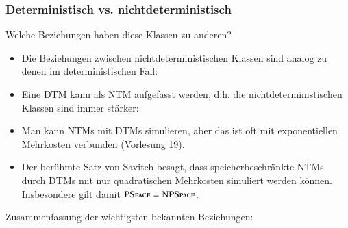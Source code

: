 \documentclass[aspectratio=1610,onlymath]{beamer}
\begin{document}
\begin{frame}\frametitle{Deterministisch vs. nichtdeterministisch}

%
Welche Beziehungen haben diese Klassen zu anderen?\pause
{\footnotesize
\begin{itemize}
\item Die Beziehungen zwischen nichtdeterministischen Klassen sind analog zu denen im deterministischen Fall:\\[1ex]
\pause
\item Eine DTM kann als NTM aufgefasst werden, d.h. die nichtdeterministischen Klassen sind immer stärker:\\[1ex]
\pause
\item Man kann NTMs mit DTMs simulieren, aber das ist oft mit exponentiellen Mehrkosten verbunden (Vorlesung 19).
\pause
\item Der berühmte \alert{Satz von Savitch} besagt, dass speicherbeschränkte NTMs durch DTMs mit nur quadratischen Mehrkosten simuliert werden können. Insbesondere gilt damit ${\textsc{PSpace}}= {\textsc{NPSpace}}$.
\end{itemize}}
Zusammenfassung der wichtigsten bekannten Beziehungen:
\theobox{
\[\Scomplclass{L}\subseteq\Scomplclass{NL}\subseteq \Scomplclass{P}\subseteq\Scomplclass{NP}\subseteq\Scomplclass{PSpace}= \Scomplclass{NPSpace}\subseteq \Scomplclass{Exp}\subseteq \Scomplclass{NExp}\]
\vspace{-2.5ex}
}

\end{frame}
\end{document}
